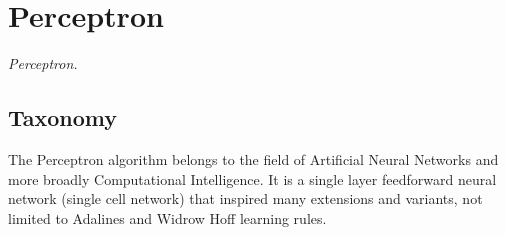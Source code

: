 

\section{Perceptron} 
\label{sec:perceptron}

\emph{Perceptron.}

\subsection{Taxonomy}
The Perceptron algorithm belongs to the field of Artificial Neural Networks and more broadly Computational Intelligence.
It is a single layer feedforward neural network (single cell network) that inspired many extensions and variants, not limited to Adalines and Widrow Hoff learning rules.


